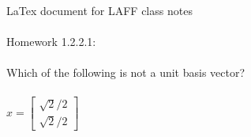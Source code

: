 \documentclass[11pt]{article}
\begin{document}
LaTex document for LAFF class notes
\\
\\
Homework 1.2.2.1:
\\
\\
Which of the following is not a unit basis vector?
\\
\\
$x =
\begin{bmatrix}
{\surd2/2} \\
{\surd2/2}
\end{bmatrix}
$
\end{document}
